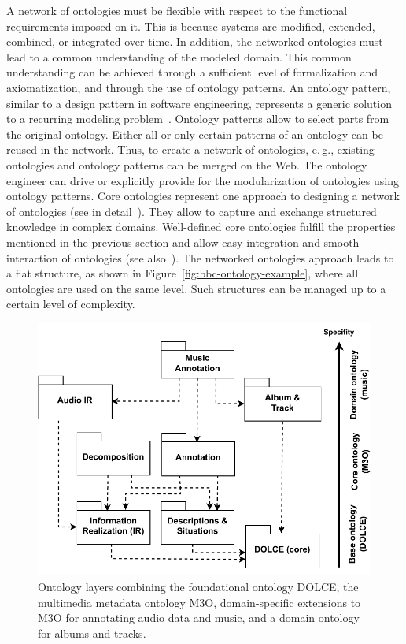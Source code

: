 \documentclass[a4paper,USenglish]{tgdk-v2021}
\begin{document}
A network of ontologies must be flexible with respect to the functional requirements imposed on it. 
This is because systems are modified, extended, combined, or integrated over time.
In addition, the networked ontologies must lead to a common understanding of the modeled domain.
This common understanding can be achieved through a sufficient level of formalization and axiomatization, and through the use of ontology patterns.
An ontology pattern, similar to a design pattern in software engineering, represents a generic solution to a recurring modeling problem~\cite{ScherpEtAlDesigningCoreOntologiesIOS2011}. 
Ontology patterns allow to select parts from the original ontology.
Either all or only certain patterns of an ontology can be reused in the network.
Thus, to create a network of ontologies, e.\,g., existing ontologies and ontology patterns can be merged on the Web.
The ontology engineer can drive or explicitly provide for the modularization of ontologies using ontology patterns.
Core ontologies represent one approach to designing a network of ontologies (see in detail~\cite{ScherpEtAlDesigningCoreOntologiesIOS2011}).
They allow to capture and exchange structured knowledge in complex domains.
Well-defined core ontologies fulfill the properties mentioned in the previous section and allow easy integration and smooth interaction of ontologies (see also~\cite{ScherpEtAlDesigningCoreOntologiesIOS2011}).
The networked ontologies approach leads to a flat structure, as shown in Figure~\ref{fig:bbc-ontology-example}, where all ontologies are used on the same level.
Such structures can be managed up to a certain level of complexity.

\begin{figure}[ht]
  \centering
   \includegraphics[scale=0.8]{figs/ontology-stack-en}
   \caption{Ontology layers combining the foundational ontology DOLCE, the multimedia metadata ontology M3O, domain-specific extensions to M3O for annotating audio data and music, and a domain ontology for albums and tracks.}
   \label{fig:ontology-stack}
\end{figure} 
\end{document}

